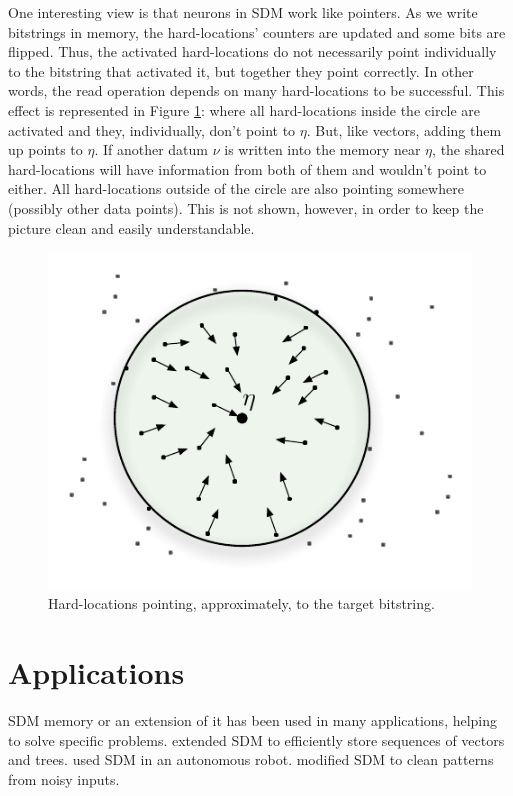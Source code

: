 One interesting view is that neurons in SDM work like pointers. As we write bitstrings in memory, the hard-locations' counters are updated and some bits are flipped. Thus, the activated hard-locations do not necessarily point individually to the bitstring that activated it, but together they point correctly. In other words, the read operation depends on many hard-locations to be successful. This effect is represented in Figure \ref{fig-p1-pointers}: where all hard-locations inside the circle are activated and they, individually, don't point to $\eta$.  But, like vectors, adding them up points to $\eta$. If another datum $\nu$ is written into the memory near $\eta$, the shared hard-locations will have information from both of them and wouldn't point to either.  All hard-locations outside of the circle are also pointing somewhere (possibly other data points). This is not shown, however, in order to keep the picture clean and easily understandable.

\begin{figure}[h]
\centering\includegraphics[scale=0.75]{./images02/p1_after_write.pdf}

\caption{Hard-locations pointing, approximately, to the target bitstring.\label{fig-p1-pointers}}
\end{figure}



\section{Applications}

SDM memory or an extension of it has been used in many applications, helping to solve specific problems. \citet{Snaider2011} extended SDM to efficiently store sequences of vectors and trees.  \citet{Rajesh1998} used SDM in an autonomous robot. \citet{Meng2009} modified SDM to clean patterns from noisy inputs.

